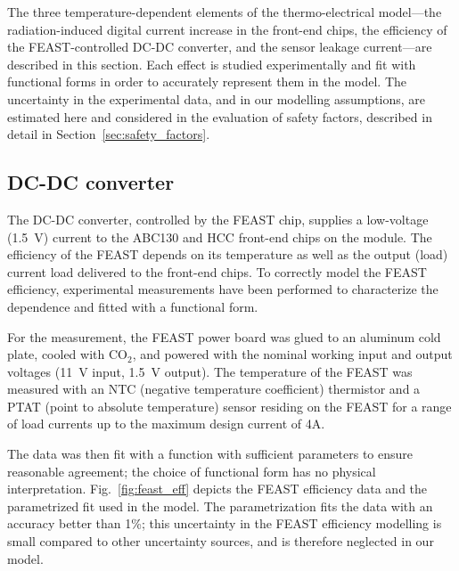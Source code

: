 
The three temperature-dependent elements of the thermo-electrical model---the
radiation-induced digital current increase in the front-end chips, the
efficiency of the FEAST-controlled DC-DC converter, and the sensor leakage current---are described in this section.
Each effect is studied experimentally and fit with functional forms
in order to accurately represent them in the model.
The uncertainty in the experimental data, and in our modelling assumptions,
are estimated here and considered in the evaluation of safety factors,
described in detail in Section~\ref{sec:safety_factors}.

\subsection{DC-DC converter}

The DC-DC converter, controlled by the FEAST chip, supplies a low-voltage (1.5~V) current to the ABC130 and HCC front-end
chips on the module.
The efficiency of the FEAST depends on its temperature as well as the output (load) current
load delivered to the front-end chips. To correctly model the FEAST efficiency, experimental
measurements have been performed to characterize the dependence and fitted with a functional form.

For the measurement, the FEAST power board was glued to an aluminum cold plate, cooled
with CO$_2$, and powered with the nominal working input and output voltages (11~V input, 1.5~V output).
The temperature of the FEAST was measured with an NTC (negative temperature coefficient) thermistor and a PTAT (point to absolute temperature) sensor residing on the FEAST
for a range of load currents up to the maximum design current of 4A.

The data was then fit with a function with sufficient parameters to ensure reasonable agreement; the
choice of functional form has no physical interpretation. Fig.~\ref{fig:feast_eff} depicts the
FEAST efficiency data and the parametrized fit used in the model. The parametrization fits the data
with an accuracy better than 1\%; this uncertainty in the FEAST efficiency modelling is small
compared to other uncertainty sources, and is therefore neglected in our model.

